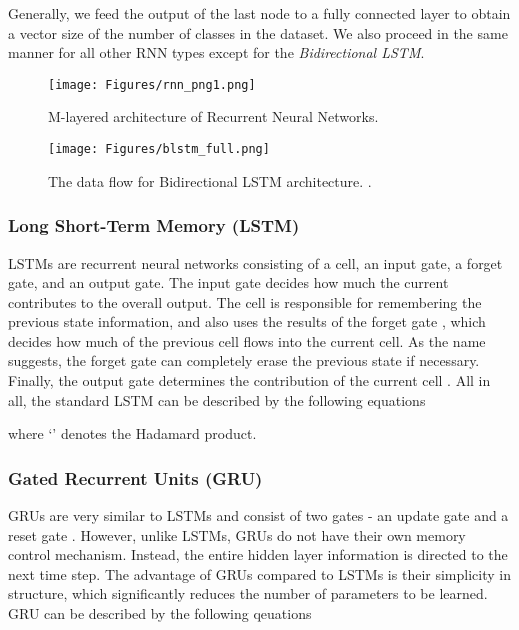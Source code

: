 \documentclass[runningheads]{llncs}
\begin{document}
\indent Generally, we feed the output of the last node to a fully connected layer to obtain a vector size of the number of classes in the dataset. We also proceed in the same manner for all other RNN types except for the \textit{Bidirectional LSTM}. 





\begin{figure}[t!]
\begin{minipage}[b]{0.480\linewidth}
\centering
\texttt{[image: Figures/rnn\_png1.png]}
	\caption{M-layered architecture of Recurrent Neural Networks.}
	\label{fig:recurrent}
\end{minipage}
\hfill
\begin{minipage}[b]{0.480\linewidth}
\centering
	\texttt{[image: Figures/blstm\_full.png]}
	\caption{The data flow for Bidirectional LSTM architecture. .}
	\label{fig:bidirectional}
\end{minipage}
\end{figure}


\subsubsection{Long Short-Term Memory (LSTM)}
LSTMs \cite{hochreiter1997long} are recurrent neural networks consisting of a cell, an input gate, a forget gate, and an output gate. The input gate  decides how much the current  contributes to the overall output. The cell  is responsible for remembering the previous state information, and also uses the results of the forget gate , which decides how much of the previous cell  flows into the current cell. 
As the name suggests, the forget gate can completely erase the previous state if necessary. Finally, the output gate determines the contribution of the current cell . All in all, the standard LSTM can be described by the following equations

\noindent where `' denotes the Hadamard product.

\subsubsection{Gated Recurrent Units (GRU)}
GRUs \cite{cho2014properties} are very similar to LSTMs and consist of two gates - an update gate  and a reset gate . However, unlike LSTMs, GRUs do not have their own memory control mechanism. Instead, the entire hidden layer information is directed to the next time step. The advantage of GRUs compared to LSTMs is their simplicity in structure, which significantly reduces the number of parameters to be learned. GRU can be described by the following qeuations
\end{document}
